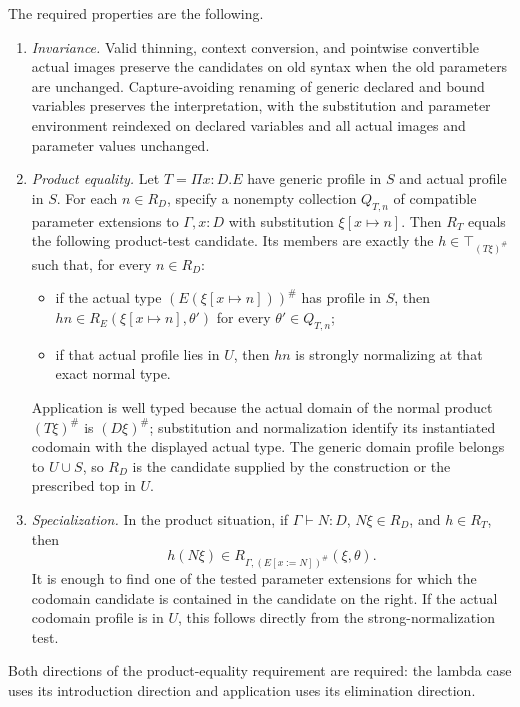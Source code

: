The required properties are the following.
\begin{enumerate}
\item\label{item:interface-invariance}
\emph{Invariance.} Valid thinning, context conversion, and pointwise
convertible actual images preserve the candidates on old syntax when
the old parameters are unchanged. Capture-avoiding renaming of generic declared and bound variables preserves
the interpretation, with the substitution and parameter environment reindexed
on declared variables and all actual images and parameter values unchanged.

\item\label{item:interface-product}
\emph{Product equality.} Let $T=\Pi x:D.E$ have generic profile in
$S$ and actual profile in $S$. For each $n\in R_D$, specify a
nonempty collection $Q_{T,n}$ of compatible parameter extensions to
$\Gamma,x:D$ with substitution $\xi[x\mapsto n]$. Then $R_T$
equals the following product-test candidate. Its members are exactly
the $h\in\top_{(T\xi)^\#}$ such that, for every $n\in R_D$:
\begin{itemize}
\item if the actual type $(E(\xi[x\mapsto n]))^\#$ has profile
      in $S$, then $h n\in R_E(\xi[x\mapsto n],\theta')$ for
      every $\theta'\in Q_{T,n}$;
\item if that actual profile lies in $U$, then $h n$ is strongly
      normalizing at that exact normal type.
\end{itemize}
Application is well typed because the actual domain of the normal
product $(T\xi)^\#$ is $(D\xi)^\#$; substitution and normalization
identify its instantiated codomain with the displayed actual type.
The generic domain profile belongs to $U\cup S$, so $R_D$ is the
candidate supplied by the construction or the prescribed top in $U$.

\item\label{item:interface-specialization}
\emph{Specialization.} In the product situation, if
$\Gamma\vdash N:D$, $N\xi\in R_D$, and $h\in R_T$, then
\begin{equation}
          h(N\xi)\in
               R_{\Gamma,(E[x:=N])^\#}(\xi,\theta).
\label{eq:interface-specialization}
\end{equation}
It is enough to find one of the tested parameter extensions for which
the codomain candidate is contained in the candidate on the right.
If the actual codomain profile is in $U$, this follows directly from
the strong-normalization test.
\end{enumerate}
Both directions of the product-equality requirement are required: the lambda case uses its
introduction direction and application uses its elimination direction.

